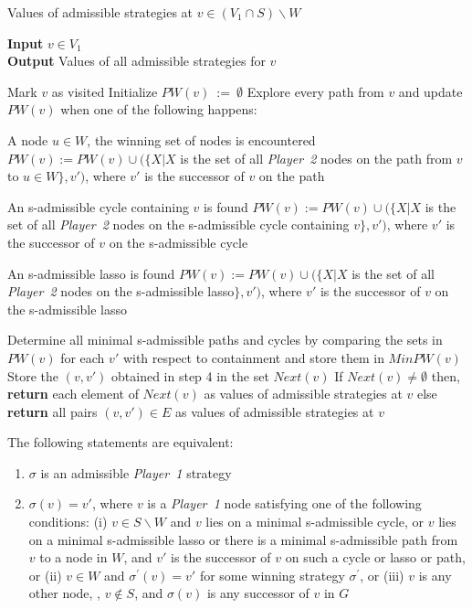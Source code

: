 \begin{algorithm}
	\caption{Values of admissible strategies at $v \in (V_{1} \cap S) \backslash W$}
	\textbf{Input} $v\in V_{1}$ \\ 
	\textbf{Output} Values of all admissible strategies for $v$
	\label{alg:algorithm3}
	\begin{algorithmic}[1]
		\STATE Mark $v$ as visited
		\STATE Initialize $PW(v) \: := \: \emptyset$
		\STATE Explore every path from $v$ and update $PW(v)$ when one of the following happens:
		\begin{case}
			A node $u \in W$, the winning set of nodes is encountered
			\newline $PW(v) := PW(v) \cup (\{ X | X$ is the set of all \textit{Player~2} nodes on the path from $v$ to $u\in W\},v')$, where $v'$ is the successor of $v$ on the path    
		\end{case}
		\begin{case}
			An s-admissible cycle containing $v$ is found
			\newline $PW(v) := PW(v) \cup (\{ X | X$ is the set of all \textit{Player~2} nodes on the s-admissible cycle containing $v\},v')$, where $v'$ is the successor of $v$ on the s-admissible cycle
		\end{case}
		\begin{case}
			An s-admissible lasso is found
			\newline $PW(v) := PW(v) \cup (\{ X | X$ is the set of all \textit{Player~2} nodes on the s-admissible lasso$\},v')$, where $v'$ is the successor of $v$ on the s-admissible lasso
		\end{case}
		\STATE Determine all minimal s-admissible paths and cycles by comparing the sets in $PW(v)$ for each $v'$ with respect to containment and store them in $MinPW(v)$
		\STATE Store the $(v,v')$ obtained in step 4 in the set $Next(v)$
		\STATE If $Next(v) \neq \emptyset$ then, \textbf{return} each element of $Next(v)$ as values of admissible strategies at $v$
		\STATE else \textbf{return} all pairs $(v,v') \in E$ as values of admissible strategies at $v$
	\end{algorithmic}
\end{algorithm}
\begin{theorem}
	\label{theorem1}
	The following statements are equivalent:
	\begin{enumerate}
		\item $\sigma$ is an admissible \textit{Player~1} strategy
		\item $\sigma(v) = v'$, where $v$ is a \textit{Player~1} node
		satisfying one of the following conditions:
		\newline (i) $v \in S \backslash W$ and $v$ lies on a minimal s-admissible cycle, or $v$ lies on a minimal s-admissible lasso or there is a minimal s-admissible path from $v$ to a node in $W$, and $v'$ is the successor of $v$ on such a cycle or lasso or path, or
		\newline (ii) $v \in W$ and $\sigma^{'}(v) = v'$ for some winning strategy $\sigma^{'}$, or
		\newline (iii) $v$ is any other node, \ie, $v \notin S$, and $\sigma(v)$ is any successor of $v$ in $G$
	\end{enumerate}
\end{theorem}
